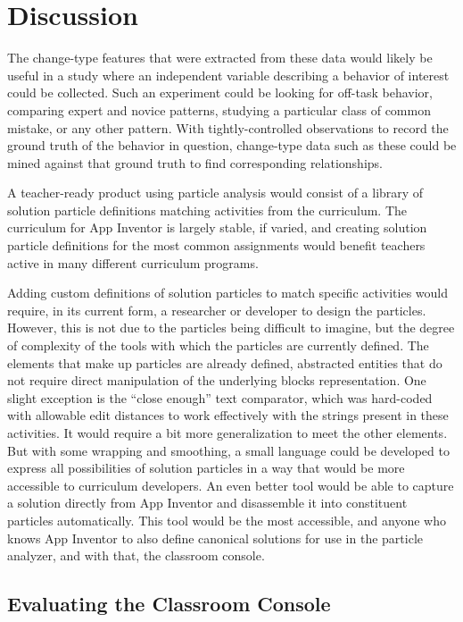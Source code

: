 \chapter{Discussion}
	
The change-type features that were extracted from these data would likely be useful in a study where an independent variable describing a behavior of interest could be collected. Such an experiment could be looking for off-task behavior, comparing expert and novice patterns, studying a particular class of common mistake, or any other pattern. With tightly-controlled observations to record the ground truth of the behavior in question, change-type data such as these could be mined against that ground truth to find corresponding relationships. 

A teacher-ready product using particle analysis would consist of a library of solution particle definitions matching activities from the curriculum. The curriculum for App Inventor is largely stable, if varied, and creating solution particle definitions for the most common assignments would benefit teachers active in many different curriculum programs. 

Adding custom definitions of solution particles to match specific activities would require, in its current form, a researcher or developer to design the particles. However, this is not due to the particles being difficult to imagine, but the degree of complexity of the tools with which the particles are currently defined. The elements that make up particles are already defined, abstracted entities that do not require direct manipulation of the underlying blocks representation. One slight exception is the ``close enough'' text comparator, which was hard-coded with allowable edit distances to work effectively with the strings present in these activities. It would require a bit more generalization to meet the other elements. But with some wrapping and smoothing, a small language could be developed to express all possibilities of solution particles in a way that would be more accessible to curriculum developers. An even better tool would be able to capture a solution directly from App Inventor and disassemble it into constituent particles automatically. This tool would be the most accessible, and anyone who knows App Inventor to also define canonical solutions for use in the particle analyzer, and with that, the classroom console. 

\section{Evaluating the Classroom Console}


